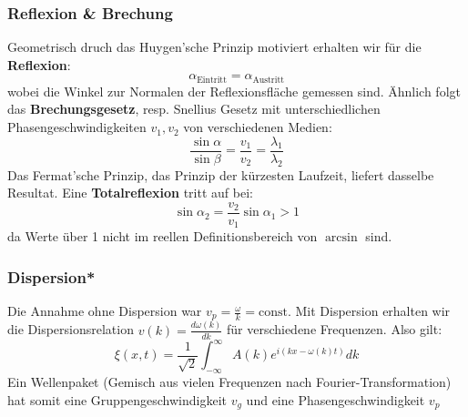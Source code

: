 \subsubsection{Reflexion \& Brechung}
Geometrisch druch das Huygen'sche Prinzip motiviert erhalten wir für die \textbf{Reflexion}:
$$\alpha_{\text{Eintritt}} = \alpha_{\text{Austritt}}$$
wobei die Winkel zur Normalen der Reflexionsfläche gemessen sind. Ähnlich folgt das \textbf{Brechungsgesetz}, resp. Snellius Gesetz mit unterschiedlichen Phasengeschwindigkeiten $v_1, v_2$ von verschiedenen Medien:$$\frac{\sin \alpha}{\sin \beta} = \frac{v_1}{v_2} = \frac{\lambda_1}{\lambda_2}$$
Das Fermat'sche Prinzip, das Prinzip der kürzesten Laufzeit, liefert dasselbe Resultat. Eine \textbf{Totalreflexion} tritt auf bei:
$$\sin \alpha_2 = \frac{v_2}{v_1}\sin \alpha_1 > 1$$
da Werte über 1 nicht im reellen Definitionsbereich von $\arcsin$ sind.
\subsubsection{Dispersion*}
Die Annahme ohne Dispersion war $v_p = \frac{\omega}{k} = \text{const}$. Mit Dispersion erhalten wir die Dispersionsrelation $v(k) = \frac{d\omega(k)}{dk}$ für verschiedene Frequenzen. Also gilt:
$$\xi(x,t) = \frac{1}{\sqrt{2}} \int_{-\infty}^\infty A(k) e^{i (kx - \omega(k)t)}dk$$
Ein Wellenpaket (Gemisch aus vielen Frequenzen nach Fourier-Transformation) hat somit eine Gruppengeschwindigkeit $v_g$ und eine Phasengeschwindigkeit $v_p$